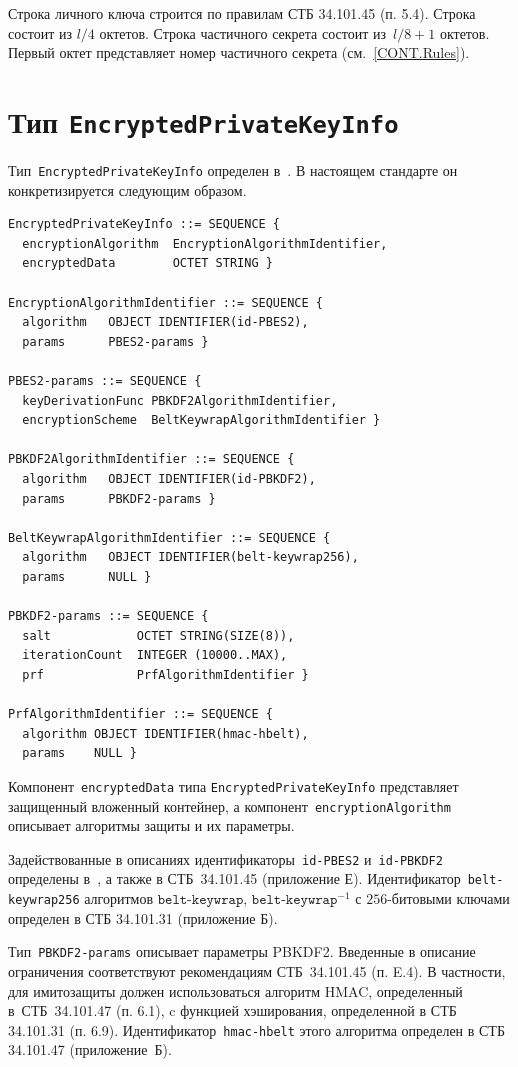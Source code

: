 Строка личного ключа строится по правилам СТБ 34.101.45 (п. 5.4). 
Строка состоит из $l/4$ октетов. 
%
Строка частичного секрета состоит из~$l/8+1$ октетов. 
Первый октет представляет номер частичного секрета (см.~\ref{CONT.Rules}).

\section{Тип \texttt{EncryptedPrivateKeyInfo}}\label{CONT.CT}

Тип~\texttt{EncryptedPrivateKeyInfo} определен в~\cite{PKCS5}. В настоящем
стандарте он конкретизируется следующим образом.
%
\begin{verbatim}
EncryptedPrivateKeyInfo ::= SEQUENCE {
  encryptionAlgorithm  EncryptionAlgorithmIdentifier,
  encryptedData        OCTET STRING }

EncryptionAlgorithmIdentifier ::= SEQUENCE {
  algorithm   OBJECT IDENTIFIER(id-PBES2),
  params      PBES2-params }

PBES2-params ::= SEQUENCE {
  keyDerivationFunc PBKDF2AlgorithmIdentifier,
  encryptionScheme  BeltKeywrapAlgorithmIdentifier }

PBKDF2AlgorithmIdentifier ::= SEQUENCE {
  algorithm   OBJECT IDENTIFIER(id-PBKDF2),
  params      PBKDF2-params }

BeltKeywrapAlgorithmIdentifier ::= SEQUENCE {
  algorithm   OBJECT IDENTIFIER(belt-keywrap256),
  params      NULL }

PBKDF2-params ::= SEQUENCE {
  salt            OCTET STRING(SIZE(8)),
  iterationCount  INTEGER (10000..MAX),
  prf             PrfAlgorithmIdentifier }

PrfAlgorithmIdentifier ::= SEQUENCE {
  algorithm OBJECT IDENTIFIER(hmac-hbelt), 
  params    NULL }
\end{verbatim}

Компонент~\texttt{encryptedData} типа \texttt{EncryptedPrivateKeyInfo}
представляет защищенный вложенный контейнер, 
а компонент~\texttt{encryptionAlgorithm} описывает
алгоритмы защиты и их параметры. 

Задействованные в описаниях идентификаторы~\texttt{id-PBES2} 
и~\texttt{id-PBKDF2} определены в~\cite{PKCS5}, а также в СТБ~34.101.45 
(приложение Е).  
%
Идентификатор~\texttt{belt-keywrap256} алгоритмов 
$\texttt{belt-keywrap}$, $\texttt{belt-keywrap}^{-1}$
с $256$-битовыми ключами определен в СТБ 34.101.31 (приложение Б).

Тип~\texttt{PBKDF2-params} описывает параметры PBKDF2.
Введенные в описание ограничения соответствуют 
рекомендациям СТБ~34.101.45 (п. E.4).
%
В частности, для имитозащиты должен использоваться алгоритм HMAC, 
определенный в~СТБ~34.101.47 (п. 6.1), c функцией хэширования, 
определенной в СТБ 34.101.31 (п. 6.9). 
Идентификатор~\texttt{hmac-hbelt} этого алгоритма 
определен в СТБ 34.101.47 (приложение~Б).

